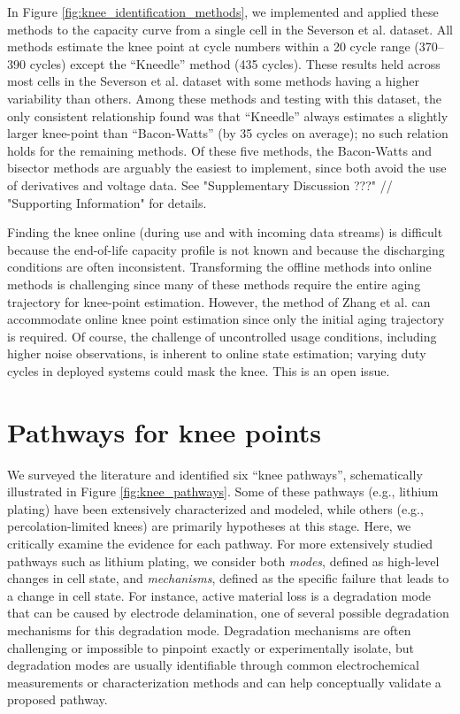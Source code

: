 \documentclass[journal=jpclcd,manuscript=article]{achemso}
\begin{document}
In Figure \ref{fig:knee_identification_methods}, we implemented and applied these methods to the capacity curve from a single cell in the Severson et al.\cite{severson_data-driven_2019} dataset. All methods estimate the knee point at cycle numbers within a 20 cycle range (370--390 cycles) except the ``Kneedle'' method (435 cycles). 
These results held across most cells in the Severson et al.\cite{severson_data-driven_2019} dataset with some methods having a  higher variability than others.   
Among these methods and testing with this dataset, the only consistent relationship found was that  ``Kneedle'' always estimates a slightly larger knee-point than ``Bacon-Watts'' (by 35 cycles on average); no such relation holds for the remaining methods. 
Of these five methods, the Bacon-Watts and bisector methods are arguably the easiest to implement, since both avoid the use of derivatives and voltage data. See "Supplementary Discussion ???" // "Supporting Information" for details. 

Finding the knee online (during use and with incoming data streams) is difficult because the end-of-life capacity profile is not known and because the discharging conditions are often inconsistent. Transforming the offline methods into online methods is challenging since many of these methods require the entire aging trajectory for knee-point estimation. However, the method of Zhang et al.\cite{zhang_accelerated_2019} can accommodate online knee point estimation since only the initial aging trajectory is required. Of course, the challenge of uncontrolled usage conditions, including higher noise observations, is inherent to online state estimation; varying duty cycles in deployed systems could mask the knee. This is an open issue.



\section{Pathways for knee points}

We surveyed the literature and identified six ``knee pathways'', schematically illustrated in Figure \ref{fig:knee_pathways}. Some of these pathways (e.g., lithium plating) have been extensively characterized and modeled, while others (e.g., percolation-limited knees) are primarily hypotheses at this stage. Here, we critically examine the evidence for each pathway. For more extensively studied pathways such as lithium plating, we consider both \textit{modes}, defined as high-level changes in cell state, and \textit{mechanisms}, defined as the specific failure that leads to a change in cell state. For instance, active material loss is a degradation mode that can be caused by electrode delamination, one of several possible degradation mechanisms for this degradation mode. Degradation mechanisms are often challenging or impossible to pinpoint exactly or experimentally isolate, but degradation modes are usually identifiable through common electrochemical measurements or characterization methods and can help conceptually validate a proposed pathway.
\end{document}
